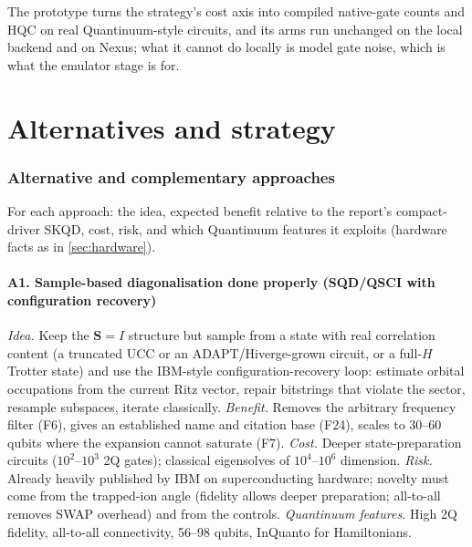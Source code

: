 \documentclass[11pt,a4paper]{article}
\newcommand{\report}{the report}
\newcommand{\takeaway}[1]{\par\smallskip\noindent{\bfseries\textcolor{keyblue}{Takeaway.}} #1\par\smallskip}
\begin{document}
\takeaway{The prototype turns the strategy's cost axis into compiled native-gate counts and HQC on real Quantinuum-style circuits, and its arms run unchanged on the local backend and on Nexus; what it cannot do locally is model gate noise, which is what the emulator stage is for.}

\clearpage
\part{Alternatives and strategy}

\section{Alternative and complementary approaches}\label{sec:alternatives}
For each approach: the idea, expected benefit relative to \report's compact-driver SKQD, cost, risk, and which Quantinuum features it exploits (hardware facts as in \cref{sec:hardware}).

\subsection*{A1. Sample-based diagonalisation done properly (SQD/QSCI with configuration recovery)}
\emph{Idea.} Keep the $\mathbf S=I$ structure but sample from a state with real correlation content (a truncated UCC or an ADAPT/Hiverge-grown circuit, or a full-$H$ Trotter state) and use the IBM-style configuration-recovery loop: estimate orbital occupations from the current Ritz vector, repair bitstrings that violate the sector, resample subspaces, iterate classically. \emph{Benefit.} Removes the arbitrary frequency filter (F6), gives an established name and citation base (F24), scales to 30--60 qubits where the expansion cannot saturate (F7). \emph{Cost.} Deeper state-preparation circuits ($10^2$--$10^3$ 2Q gates); classical eigensolves of $10^4$--$10^6$ dimension. \emph{Risk.} Already heavily published by IBM on superconducting hardware; novelty must come from the trapped-ion angle (fidelity allows deeper preparation; all-to-all removes SWAP overhead) and from the controls. \emph{Quantinuum features.} High 2Q fidelity, all-to-all connectivity, 56--98 qubits, InQuanto for Hamiltonians.
\end{document}
